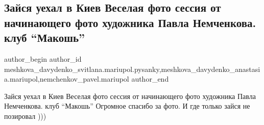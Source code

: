  
 
 
 
 

\subsection{Зайся уехал в Киев Веселая фото сессия от начинающего фото художника Павла Немченкова. клуб \enquote{Макошь}}
\label{sec:02_04_2018.fb.meshkova_davydenko_svitlana.mariupol.pysanky.1.zajsja_uehal_v_kiev_veselaja_fotosessia}
 
\ifcmt
 author_begin
   author_id meshkova_davydenko_svitlana.mariupol.pysanky,meshkova_davydenko_anastasia.mariupol,nemchenkov_pavel.mariupol
 author_end
\fi

Зайся уехал в Киев Веселая фото сессия от начинающего фото художника Павла
Немченкова. клуб \enquote{Макошь} Огромное спасибо за фото. И где только зайся не
позировал )))
